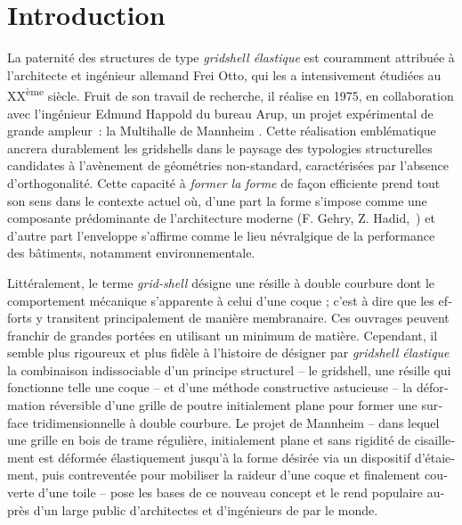 
\newrefsegment
\chapter*{Introduction}\label{chp=intro}

\begin{otherlanguage}{french}


La paternité des structures de type \emph{gridshell élastique} est couramment attribuée à l'architecte et ingénieur allemand Frei Otto, qui les a intensivement étudiées au XX\textsuperscript{ème} siècle. Fruit de son travail de recherche, il réalise en 1975, en collaboration avec l'ingénieur Edmund Happold du bureau Arup, un projet expérimental de grande ampleur~: la Multihalle de Mannheim \cite{IL13,Happold1975}. Cette réalisation emblématique ancrera durablement les gridshells dans le paysage des typologies structurelles candidates à l'avènement de géométries non-standard, caractérisées par l'absence d'orthogonalité. Cette capacité à \emph{former la forme} de façon efficiente prend tout son sens dans le contexte actuel où, d'une part la forme s'impose comme une composante prédominante de l'architecture moderne (F. Gehry, Z. Hadid,~\telp{}) et d'autre part l'enveloppe s'affirme comme le lieu névralgique de la performance des bâtiments, notamment environnementale.

Littéralement, le terme \emph{grid-shell} désigne une résille à double courbure dont le comportement mécanique s'apparente à celui d'une coque ; c'est à dire que les efforts y transitent principalement de manière membranaire. Ces ouvrages peuvent franchir de grandes portées en utilisant un minimum de matière. Cependant, il semble plus rigoureux et plus fidèle à l'histoire de désigner par \emph{gridshell élastique} la combinaison indissociable d'un principe structurel -- le gridshell, une résille qui fonctionne telle une coque -- et d'une méthode constructive astucieuse -- la déformation réversible d'une grille de poutre initialement plane pour former une surface tridimensionnelle à double courbure. Le projet de Mannheim -- dans lequel une grille en bois de trame régulière, initialement plane et sans rigidité de cisaillement est déformée élastiquement jusqu'à la forme désirée via un dispositif d'étaiement, puis contreventée pour mobiliser la raideur d'une coque et finalement couverte d'une toile -- pose les bases de ce nouveau concept et le rend populaire auprès d'un large public d'architectes et d'ingénieurs de par le monde.


\end{otherlanguage}
